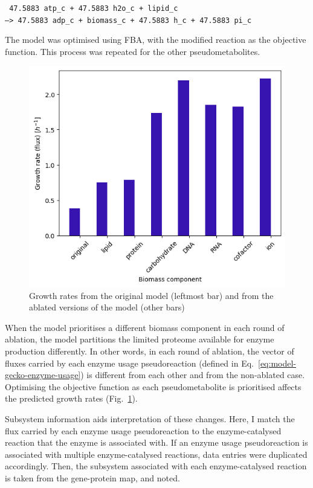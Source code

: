 \texttt{
  47.5883 atp\_c + 47.5883 h2o\_c + lipid\_c \\
  --> 47.5883 adp\_c + biomass\_c + 47.5883 h\_c + 47.5883 pi\_c
}

The model was optimised using FBA, with the modified reaction as the objective function.
This process was repeated for the other pseudometabolites.

\begin{figure}
  \centering
  \includegraphics[width=.6\linewidth]{ablation_example_fluxes.png}
  \caption{
    Growth rates from the original model (leftmost bar) and from the ablated versions of the model (other bars)
  }
  \label{fig:model-ablate-fluxes}
\end{figure}

When the model prioritises a different biomass component in each round of ablation, the model partitions the limited proteome available for enzyme production differently.
In other words, in each round of ablation, the vector of fluxes carried by each enzyme usage pseudoreaction (defined in Eq.\ \ref{eq:model-gecko-enzyme-usage}) is different from each other and from the non-ablated case.
Optimising the objective function as each pseudometabolite is prioritised affects the predicted growth rates (Fig.\ \ref{fig:model-ablate-fluxes}).

Subsystem information aids interpretation of these changes.
Here, I match the flux carried by each enzyme usage pseudoreaction to the enzyme-catalysed reaction that the enzyme is associated with.
If an enzyme usage pseudoreaction is associated with multiple enzyme-catalysed reactions, data entries were duplicated accordingly.
Then, the subsystem associated with each enzyme-catalysed reaction is taken from the gene-protein map, and noted.

